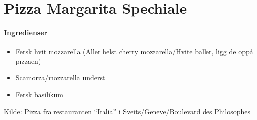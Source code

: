 \section{﻿Pizza Margarita Spechiale}


\paragraph{Ingredienser}
\begin{itemize}[noitemsep]
	\item Fersk hvit mozzarella (Aller helst cherry mozzarella/Hvite baller, ligg de oppå pizzaen)
	\item Scamorza/mozzarella underst
	\item Fersk basilikum
\end{itemize}


Kilde: Pizza fra restauranten “Italia” i Sveits/Geneve/Boulevard des Philosophes
